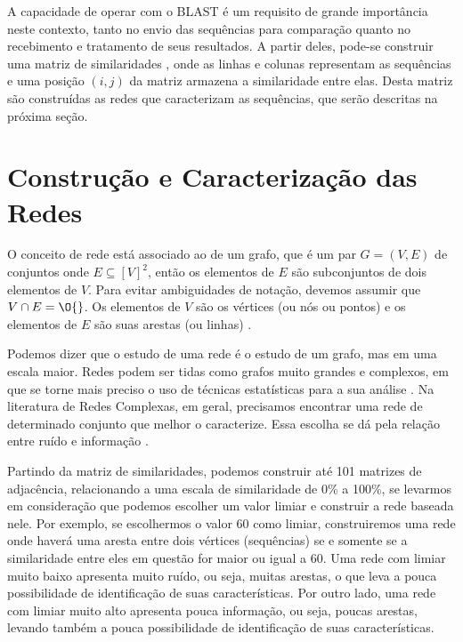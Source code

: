 
A capacidade de operar com o BLAST é um requisito de grande importância neste contexto, tanto no envio das sequências para comparação quanto no recebimento
e tratamento de seus resultados. A partir deles, pode-se construir uma matriz de similaridades \cite{andrade2006}, onde as linhas e colunas representam as
sequências e uma posição $(i, j)$ da matriz armazena a similaridade entre elas. Desta matriz são construídas as redes que caracterizam as sequências, que
serão descritas na próxima seção.

\section{Construção e Caracterização das Redes} \label{sec:conscarac}

O conceito de rede está associado ao de um grafo, que é um par $G = (V, E)$ de conjuntos onde $E \subseteq [V]^2$, então os elementos de $E$
são subconjuntos de dois elementos de $V$. Para evitar ambiguidades de notação, devemos assumir que $V \cap E = \O{}$. Os elementos de $V$ são os vértices
(ou nós ou pontos) e os elementos de $E$ são suas arestas (ou linhas) \cite{reinhard2010}.

Podemos dizer que o estudo de uma rede é o estudo de um grafo, mas em uma escala maior. Redes podem ser tidas como grafos muito grandes e complexos,
em que se torne mais preciso o uso de técnicas estatísticas para a sua análise \cite{bessa2008}. Na literatura de Redes Complexas, em geral, precisamos
encontrar uma rede de determinado conjunto que melhor o caracterize. Essa escolha se dá pela relação entre ruído e informação \cite{barabasi2004}.

Partindo da matriz de similaridades, podemos construir até 101 matrizes de adjacência, relacionando a uma escala de similaridade de 0\% a 100\%, se levarmos
em consideração que podemos escolher um valor limiar e construir a rede baseada nele. Por exemplo, se escolhermos o valor 60 como limiar, construiremos uma
rede onde haverá uma aresta entre dois vértices (sequências) se e somente se a similaridade entre eles em questão for maior ou igual a 60. Uma rede com limiar
muito baixo apresenta muito ruído, ou seja, muitas arestas, o que leva a pouca possibilidade de identificação de suas características. Por outro lado, uma
rede com limiar muito alto apresenta pouca informação, ou seja, poucas arestas, levando também a pouca possibilidade de identificação de suas características.

